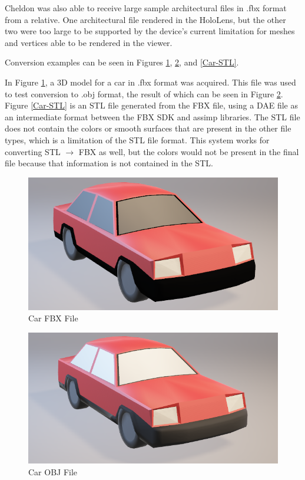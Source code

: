     Cheldon was also able to receive large sample architectural files in .fbx format from a relative. One architectural file rendered in the HoloLens, but the other two were too large to be supported by the device's current limitation for meshes and vertices able to be rendered in the viewer.

    Conversion examples can be seen in Figures \ref{Car-FBX}, \ref{Car-OBJ}, and \ref{Car-STL}.  
    
    In Figure \ref{Car-FBX}, a 3D model for a car in .fbx format was acquired. This file was used to test conversion to .obj format, the result of which can be seen in Figure \ref{Car-OBJ}. Figure \ref{Car-STL} is an STL file generated from the FBX file, using a DAE file as an intermediate format between the FBX SDK and assimp libraries. The STL file does not contain the colors or smooth surfaces that are present in the other file types, which is a limitation of the STL file format. This system works for converting STL $\rightarrow$ FBX as well, but the colors would not be present in the final file because that information is not contained in the STL. 
    
\begin{figure}[H]
    \centering
    \includegraphics[width=\textwidth]{Car-FBX.png}
    \caption{Car FBX File}
    \label{Car-FBX}
\end{figure}

\begin{figure}[H]
    \centering
    \includegraphics[width=\textwidth]{Car-OBJ.png}
    \caption{Car OBJ File}
    \label{Car-OBJ}
\end{figure}


